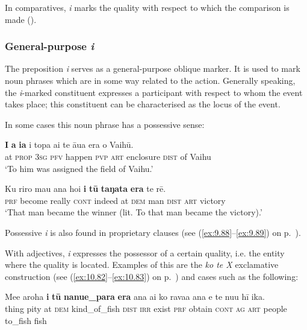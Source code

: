 In comparatives, \textit{{\ꞌ}i} marks the quality with respect to which the comparison is made ().

\subsubsection[General{}-purpose i]{General-purpose \textit{i}}\label{sec:4.7.2.3}
The preposition \textit{i} serves as a general-purpose oblique marker. It is used to mark noun phrases which are in some way related to the action. Generally speaking, the \textit{i}{}-marked constituent expresses a participant with respect to whom the event takes place; this constituent can be characterised as the locus of the event.

In some cases this noun phrase has a possessive sense:

\ea\label{ex:4.256}
\gll \textbf{I} \textbf{a} \textbf{ia} i topa ai te {\ꞌ}āua era o Vaihū.\\
at \textsc{prop} \textsc{3sg} \textsc{pfv} happen \textsc{pvp} \textsc{art} enclosure \textsc{dist} of Vaihu\\

\glt 
‘To him was assigned the field of Vaihu.’ \textstyleExampleref{[R250.052]} 
\z

\ea\label{ex:4.257}
\gll Ku riro mau {\ꞌ}ana ho{\ꞌ}i \textbf{i} \textbf{tū} \textbf{taŋata} \textbf{era} te rē.\\
\textsc{prf} become really \textsc{cont} indeed at \textsc{dem} man \textsc{dist} \textsc{art} victory\\

\glt
‘That man became the winner (lit. To that man became the victory).’ \textstyleExampleref{[R372.154]} 
\z

Possessive \textit{i} is also found in proprietary clauses (see (\ref{ex:9.88}–\ref{ex:9.89}) on p.~\pageref{ex:9.88}).

With adjectives, \textit{i} expresses the possessor of a certain quality, i.e. the entity where the quality is located. Examples of this are the \textit{ko te X} exclamative construction (see (\ref{ex:10.82}–\ref{ex:10.83}) on p.~\pageref{ex:10.82}) and cases such as the following:

\ea\label{ex:4.258}
\gll Me{\ꞌ}e {\ꞌ}aroha \textbf{i} \textbf{tū} \textbf{nanue\_para} \textbf{era} ana ai ko rava{\ꞌ}a {\ꞌ}ana e te nu{\ꞌ}u  hī ika.\\
thing pity at \textsc{dem} kind\_of\_fish \textsc{dist} \textsc{irr} exist \textsc{prf} obtain \textsc{cont} \textsc{ag} \textsc{art} people  to\_fish fish\\

